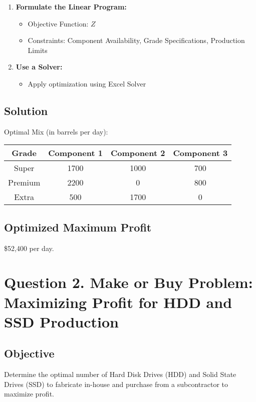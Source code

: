 \documentclass[8pt]{article}
\begin{document}
\begin{enumerate}
    \item \textbf{Formulate the Linear Program:}
    \begin{itemize}
        \item Objective Function: \( Z \)
        \item Constraints: Component Availability, Grade Specifications, Production Limits
    \end{itemize}
    
    \item \textbf{Use a Solver:}
    \begin{itemize}
        \item Apply optimization using Excel Solver
       
    \end{itemize}
\end{enumerate}

\subsection*{Solution}
Optimal Mix (in barrels per day):

\begin{tabular}{|c|c|c|c|}
\hline
Grade & Component 1 & Component 2 & Component 3 \\
\hline
Super & 1700 & 1000 & 700 \\
Premium & 2200 & 0 & 800 \\
Extra & 500 & 1700 & 0 \\
\hline
\end{tabular}

\subsection*{Optimized Maximum Profit}
\$52,400 per day.
\vspace{290pt}
\newpage


\section*{Question 2. Make or Buy Problem: Maximizing Profit for HDD and SSD Production}

\subsection*{Objective}
Determine the optimal number of Hard Disk Drives (HDD) and Solid State Drives (SSD) to fabricate in-house and purchase from a subcontractor to maximize profit.
\end{document}
